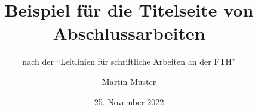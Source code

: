 \documentclass{scrreport}
\begin{document}
\title{Beispiel für die Titelseite von Abschlussarbeiten}
\subtitle{nach der \enquote{Leitlinien für schriftliche Arbeiten an der FTH}}
\author{Martin Muster}
\date{25. November 2022}

\maketitle
\end{document}
